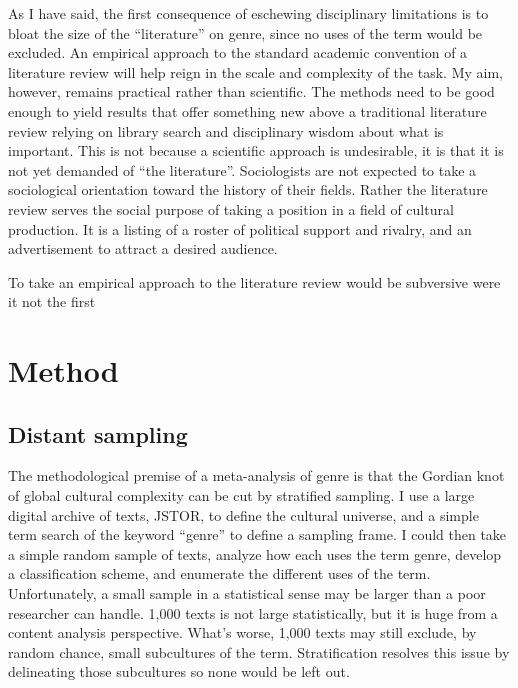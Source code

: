 \documentclass[]{book}
\theoremstyle{definition}
\theoremstyle{definition}
\theoremstyle{definition}
\theoremstyle{remark}
\begin{document}
As I have said, the first consequence of eschewing disciplinary
limitations is to bloat the size of the ``literature'' on genre, since
no uses of the term would be excluded. An empirical approach to the
standard academic convention of a literature review will help reign in
the scale and complexity of the task. My aim, however, remains practical
rather than scientific. The methods need to be good enough to yield
results that offer something new above a traditional literature review
relying on library search and disciplinary wisdom about what is
important. This is not because a scientific approach is undesirable, it
is that it is not yet demanded of ``the literature''. Sociologists are
not expected to take a sociological orientation toward the history of
their fields. Rather the literature review serves the social purpose of
taking a position in a field of cultural production. It is a listing of
a roster of political support and rivalry, and an advertisement to
attract a desired audience.

To take an empirical approach to the literature review would be
subversive were it not the first

\hypertarget{method}{%
\section{Method}\label{method}}

\hypertarget{distant-sampling}{%
\subsection{Distant sampling}\label{distant-sampling}}

The methodological premise of a meta-analysis of genre is that the
Gordian knot of global cultural complexity can be cut by stratified
sampling. I use a large digital archive of texts, JSTOR, to define the
cultural universe, and a simple term search of the keyword ``genre'' to
define a sampling frame. I could then take a simple random sample of
texts, analyze how each uses the term genre, develop a classification
scheme, and enumerate the different uses of the term. Unfortunately, a
small sample in a statistical sense may be larger than a poor researcher
can handle. 1,000 texts is not large statistically, but it is huge from
a content analysis perspective. What's worse, 1,000 texts may still
exclude, by random chance, small subcultures of the term. Stratification
resolves this issue by delineating those subcultures so none would be
left out.
\end{document}
